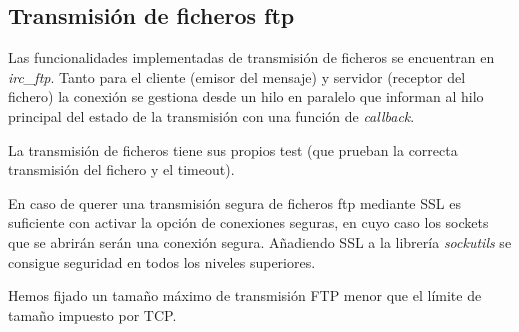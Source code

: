 \subsection{Transmisión de ficheros ftp}

Las funcionalidades implementadas de transmisión de ficheros se encuentran en \textit{irc\_ftp}. Tanto para el cliente (emisor del mensaje) y servidor (receptor del fichero) la conexión se gestiona desde un hilo en paralelo que informan al hilo principal del estado de la transmisión con una función de \textit{callback}. 

La transmisión de ficheros tiene sus propios test (que prueban la correcta transmisión del fichero y el timeout).

En caso de querer una transmisión segura de ficheros ftp mediante SSL es suficiente con activar la opción de conexiones seguras, en cuyo caso los sockets que se abrirán serán una conexión segura. Añadiendo SSL a la librería \textit{sockutils} se consigue seguridad en todos los niveles superiores.

Hemos fijado un tamaño máximo de transmisión FTP menor que el límite de tamaño impuesto por TCP.
